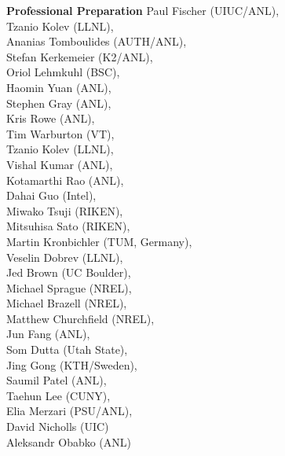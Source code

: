 \documentclass[11pt,letterpaper,english]{article}
\begin{document}
\begin{flushleft} {\bf Professional Preparation}
{Paul Fischer (UIUC/ANL),\\
Tzanio Kolev (LLNL), \\
Ananias Tomboulides (AUTH/ANL),\\
Stefan Kerkemeier (K2/ANL),\\
Oriol Lehmkuhl (BSC),\\
Haomin Yuan (ANL),\\
Stephen Gray (ANL),\\
Kris Rowe (ANL),\\
Tim Warburton (VT), \\
Tzanio Kolev (LLNL), \\
Vishal Kumar (ANL),\\
Kotamarthi Rao (ANL), \\
Dahai Guo (Intel), \\
Miwako Tsuji (RIKEN), \\ 
Mitsuhisa Sato (RIKEN),\\
Martin Kronbichler (TUM, Germany), \\
Veselin Dobrev (LLNL), \\
Jed Brown (UC Boulder), \\
Michael Sprague (NREL),\\
Michael Brazell (NREL), \\
Matthew Churchfield (NREL), \\
Jun Fang (ANL),\\
Som Dutta (Utah State),  \\
Jing Gong (KTH/Sweden), \\
Saumil Patel (ANL), \\
Taehun Lee (CUNY), \\
Elia Merzari (PSU/ANL), \\
David Nicholls (UIC) \\
Aleksandr Obabko (ANL)}   


\end{flushleft}
\end{document}
